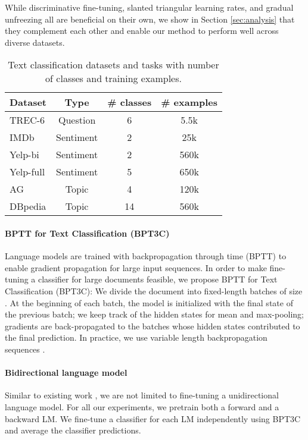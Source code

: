 \documentclass[11pt,a4paper]{article}
\begin{document}
While discriminative fine-tuning, slanted triangular learning rates, and gradual unfreezing all are beneficial on their own, we show in Section \ref{sec:analysis} that they complement each other and enable our method to perform well across diverse datasets.

\begin{table}
  \centering
\begin{tabular}{l c c c}
    \toprule
Dataset & Type & \# classes & \# examples\\
\midrule
TREC-6  & Question & 6 & 5.5k  \\
IMDb    & Sentiment & 2 & 25k   \\
Yelp-bi & Sentiment & 2 & 560k \\
Yelp-full & Sentiment & 5 & 650k \\
AG & Topic & 4 & 120k\\
DBpedia & Topic & 14 & 560k\\
\bottomrule
  \end{tabular}
      \caption{Text classification datasets and tasks with number of classes and training examples.}
  \label{tab:tasks}
\end{table}

\paragraph{BPTT for Text Classification (BPT3C)} Language models are trained with backpropagation through time (BPTT) to enable gradient propagation for large input sequences. In order to make fine-tuning a classifier for large documents feasible, we propose BPTT for Text Classification (BPT3C): We divide the document into fixed-length batches of size . At the beginning of each batch, the model is initialized with the final state of the previous batch; we keep track of the hidden states for mean and max-pooling; gradients are back-propagated to the batches whose hidden states contributed to the final prediction. In practice, we use variable length backpropagation sequences \cite{Merity2017}.

\paragraph{Bidirectional language model} Similar to existing work \cite{peters2017semi,deepcontext2017}, we are not limited to fine-tuning a unidirectional language model. For all our experiments, we pretrain both a forward and a backward LM. We fine-tune a classifier for each LM independently using BPT3C and average the classifier predictions.
\end{document}
